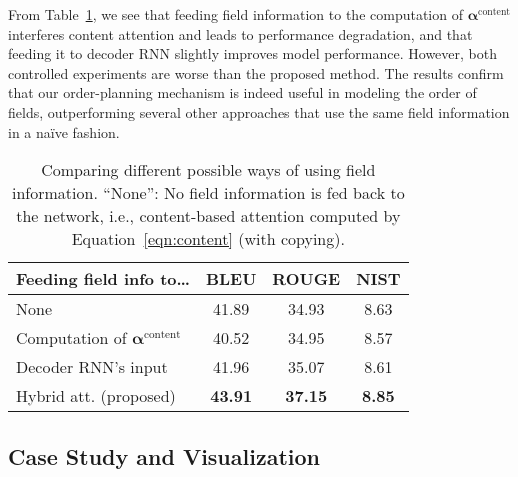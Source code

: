 \documentclass[letterpaper]{article} %
\begin{document}
From Table~\ref{tab:field}, we see that feeding field information to the computation of $\bm \alpha^\text{content}$ interferes content attention and leads to performance degradation, and that feeding it to decoder RNN slightly improves model performance. However, both controlled experiments are worse than the proposed method. The results confirm that our order-planning mechanism is indeed useful in modeling the order of fields, outperforming several other approaches that use the same field information in a na\"ive fashion.

\begin{table}[!t]
	\centering
	\begin{tabular}{lccc}
		\toprule
		\!\!\textbf{Feeding field info to\dots} & \textbf{BLEU} & \textbf{ROUGE} & \textbf{NIST}\\
		\midrule
		None   &41.89 &34.93 & 8.63\\
		Computation of $\bm \alpha^\text{content}$  &40.52&34.95&8.57\\
		Decoder RNN's input  & 41.96 & 35.07 & 8.61\\
		\midrule
		Hybrid att. (proposed) &\textbf{43.91} &\textbf{37.15} & \textbf{8.85}\\
		\bottomrule
	\end{tabular}
	\caption{Comparing different possible ways of using field information. ``None'': No field information is fed back to the network, i.e., content-based attention computed by Equation~\ref{eqn:content} (with copying).}
	\label{tab:field}
\end{table}







\subsection{Case Study and Visualization}
\end{document}
